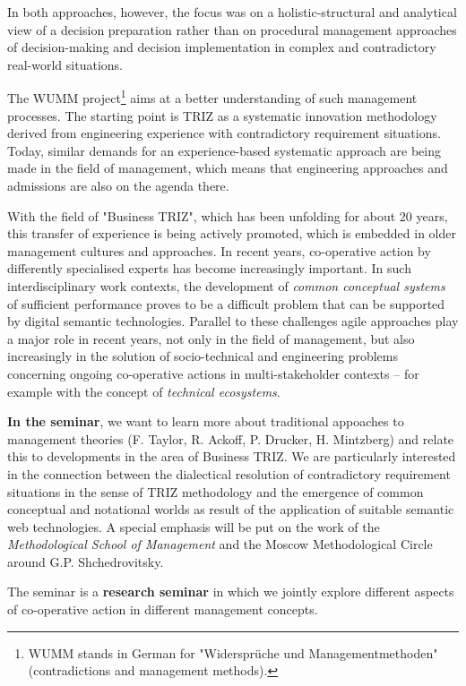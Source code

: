 \documentclass[11pt,a4paper]{article}
\begin{document}
In both approaches, however, the focus was on a holistic-structural and
analytical view of a decision preparation rather than on procedural management
approaches of decision-making and decision implementation in complex and
contradictory real-world situations.

The WUMM project\footnote{WUMM stands in German for "Widersprüche und
  Managementmethoden" (contradictions and management methods).} aims at a
better understanding of such management processes. The starting point is TRIZ
as a systematic innovation methodology derived from engineering experience
with contradictory requirement situations. Today, similar demands for an
experience-based systematic approach are being made in the field of
management, which means that engineering approaches and admissions are also on
the agenda there.

With the field of "Business TRIZ", which has been unfolding for about 20
years, this transfer of experience is being actively promoted, which is
embedded in older management cultures and approaches.  In recent years,
co-operative action by differently specialised experts has become increasingly
important. In such interdisciplinary work contexts, the development of
\emph{common conceptual systems} of sufficient performance proves to be a
difficult problem that can be supported by digital semantic technologies.
Parallel to these challenges agile approaches play a major role in recent
years, not only in the field of management, but also increasingly in the
solution of socio-technical and engineering problems concerning ongoing
co-operative actions in multi-stakeholder contexts -- for example with the
concept of \emph{technical ecosystems}.

\textbf{In the seminar}, we want to learn more about traditional appoaches to
management theories (F. Taylor, R. Ackoff, P. Drucker, H. Mintzberg) and
relate this to developments in the area of Business TRIZ.  We are particularly
interested in the connection between the dialectical resolution of
contradictory requirement situations in the sense of TRIZ methodology and the
emergence of common conceptual and notational worlds as result of the
application of suitable semantic web technologies.  A special emphasis will be
put on the work of the \emph{Methodological School of Management} and the
Moscow Methodological Circle around G.P. Shchedrovitsky. 

The seminar is a \textbf{research seminar} in which we jointly explore
different aspects of co-operative action in different management concepts.
\end{document}

